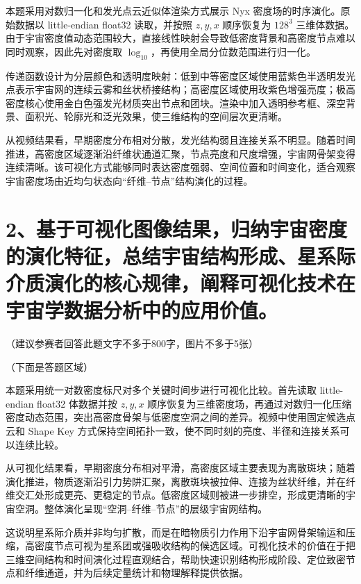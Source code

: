 \documentclass[12pt, a4paper]{article}
\begin{document}
\noindent 本题采用对数归一化和发光点云近似体渲染方式展示 Nyx 密度场的时序演化。原始数据以 little-endian float32 读取，并按照 $z,y,x$ 顺序恢复为 $128^3$ 三维体数据。由于宇宙密度值动态范围较大，直接线性映射会导致低密度背景和高密度节点难以同时观察，因此先对密度取 $\log_{10}$，再使用全局分位数范围进行归一化。

\noindent 传递函数设计为分层颜色和透明度映射：低到中等密度区域使用蓝紫色半透明发光点表示宇宙网的连续云雾和丝状桥接结构；高密度区域使用玫紫色增强亮度；极高密度核心使用金白色强发光材质突出节点和团块。渲染中加入透明参考框、深空背景、面积光、轮廓光和泛光效果，使三维结构的空间层次更清晰。

\noindent 从视频结果看，早期密度分布相对分散，发光结构弱且连接关系不明显。随着时间推进，高密度区域逐渐沿纤维状通道汇聚，节点亮度和尺度增强，宇宙网骨架变得连续清晰。该可视化方式能够同时表达密度强弱、空间位置和时间变化，适合观察宇宙密度场由近均匀状态向“纤维--节点”结构演化的过程。

\section*{2、基于可视化图像结果，归纳宇宙密度的演化特征，总结宇宙结构形成、星系际介质演化的核心规律，阐释可视化技术在宇宙学数据分析中的应用价值。}

{\small （建议参赛者回答此题文字不多于800字，图片不多于5张）}

\vspace{0.5em}
\noindent（下面是答题区域）

\noindent 本题采用统一对数密度标尺对多个关键时间步进行可视化比较。首先读取 little-endian float32 体数据并按 $z,y,x$ 顺序恢复为三维密度场，再通过对数归一化压缩密度动态范围，突出高密度骨架与低密度空洞之间的差异。视频中使用固定候选点云和 Shape Key 方式保持空间拓扑一致，使不同时刻的亮度、半径和连接关系可以连续比较。

\noindent 从可视化结果看，早期密度分布相对平滑，高密度区域主要表现为离散斑块；随着演化推进，物质逐渐沿引力势阱汇聚，离散斑块被拉伸、连接为丝状纤维，并在纤维交汇处形成更亮、更稳定的节点。低密度区域则被进一步排空，形成更清晰的宇宙空洞。整体演化呈现“空洞--纤维--节点”的层级宇宙网结构。

\noindent 这说明星系际介质并非均匀扩散，而是在暗物质引力作用下沿宇宙网骨架输运和压缩，高密度节点可视为星系团或强吸收结构的候选区域。可视化技术的价值在于把三维空间结构和时间演化过程直观结合，帮助快速识别结构形成阶段、定位致密节点和纤维通道，并为后续定量统计和物理解释提供依据。

\end{document}
